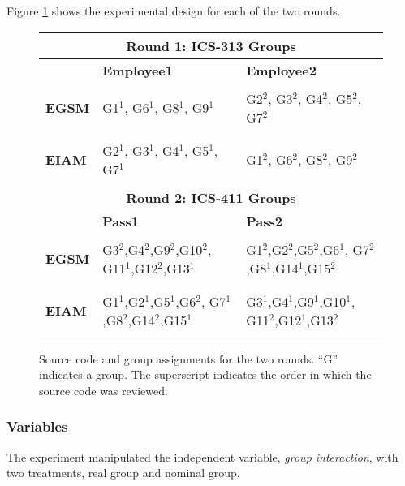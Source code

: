 Figure \ref{design} shows the experimental design 
for each of the two rounds. 

\begin{figure}[htb]
    \small
  \begin{center}
    \begin{tabular} {|l|p{1.2in}|p{1.2in}|}
      \multicolumn{3}{c}{{\bf Round 1: ICS-313 Groups}}\\
      \hline
      & {\bf Employee1} & {\bf Employee2}\\
      \hline
      & & \\
      {\bf EGSM} & G1$^1$, G6$^1$, G8$^1$, G9$^1$ & G2$^2$, G3$^2$, G4$^2$, G5$^2$, G7$^2$ \\
      & & \\
      \hline
      & & \\
      {\bf EIAM} & G2$^1$, G3$^1$, G4$^1$, G5$^1$, G7$^1$ & G1$^2$, G6$^2$, G8$^2$, G9$^2$ \\
      & &  \\
      \hline
      \multicolumn{3}{c}{{\bf Round 2: ICS-411 Groups}}\\
      \hline
      & {\bf Pass1} & {\bf Pass2}\\
      \hline
      & & \\
      {\bf EGSM} & G3$^2$,G4$^2$,G9$^2$,G10$^2$, G11$^1$,G12$^2$,G13$^1$ & G1$^2$,G2$^2$,G5$^2$,G6$^1$, G7$^2$,G8$^1$,G14$^1$,G15$^2$\\
      & & \\
      \hline
      & & \\
      {\bf EIAM} & G1$^1$,G2$^1$,G5$^1$,G6$^2$,
      G7$^1$,G8$^2$,G14$^2$,G15$^1$ & G3$^1$,G4$^1$,G9$^1$,G10$^1$, G11$^2$,G12$^1$,G13$^2$ \\
      & &  \\
      \hline
     \end{tabular}
  \end{center}
  \caption{Source code and group assignments for the two rounds. ``G''
  indicates a group. The
  superscript indicates the order in which the source code was reviewed.}
  \label{design}
  \normalsize
\end{figure}

\subsubsection{Variables}

The experiment manipulated the independent variable, {\em group interaction},
with two treatments, real group and nominal group. 


